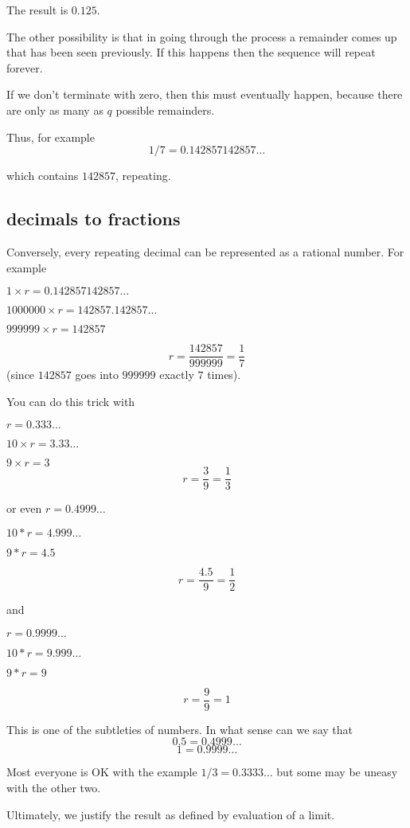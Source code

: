 \documentclass[11pt, oneside]{article}
\begin{document}
The result is $0.125$.

The other possibility is that in going through the process a remainder comes up that has been seen previously.  If this happens then the sequence will repeat forever.

If we don't terminate with zero, then this must eventually happen, because there are only as many as $q$ possible remainders.

Thus, for example
\[ 1/7 = 0.142857142857 \dots \]

which contains $142857$, repeating.

\subsection*{decimals to fractions}

Conversely, every repeating decimal can be represented as a rational number.  For example

$1 \times r = 0.142857142857 \dots$

$1000000 \times r = 142857.142857 \dots$

$999999 \times r = 142857$

\[ r = \frac{142857}{999999} = \frac{1}{7} \]
(since $142857$ goes into $999999$ exactly $7$ times).  

You can do this trick with 

$r = 0.333 \dots$

$10 \times r = 3.33 \dots$

$9 \times r = 3$
\[ r = \frac{3}{9} = \frac{1}{3} \]

or even
$r = 0.4999 \dots$

$10*r = 4.999 \dots$

$9*r = 4.5$

\[ r = \frac{4.5}{9} = \frac{1}{2} \]

and

$r = 0.9999 \dots$

$10*r = 9.999 \dots$

$9*r = 9$

\[ r = \frac{9}{9} = 1 \]

This is one of the subtleties of numbers.  In what sense can we say that 
\[ 0.5 = 0.4999 \dots \]
\[ 1 = 0.9999 \dots \]

Most everyone is OK with the example $1/3 = 0.3333 \dots$ but some may be uneasy with the other two.

Ultimately, we justify the result as defined by evaluation of a limit.  
\end{document}
